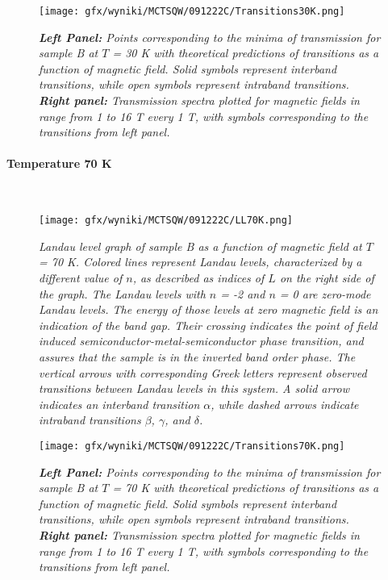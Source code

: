 \documentclass[titlepage,a4paper]{book}
\newcommand{\wciecie}{\quad\phantom{v}}
\newcommand{\myparagraph}[1]{\paragraph{#1}\mbox{}\\}
\begin{document}
\begin{figure}[ht]
	\centering
	\texttt{[image: gfx/wyniki/MCTSQW/091222C/Transitions30K.png]}
	\vspace{-10pt}
	\caption{\textit{\textbf{Left Panel:} Points corresponding to the minima of transmission for sample B at $T$ = 30 K with theoretical predictions of transitions as a function of magnetic field. Solid symbols represent interband transitions, while open symbols represent intraband transitions. \textbf{Right panel:} Transmission spectra plotted for magnetic fields in range from 1 to 16 T every 1 T, with symbols corresponding to the transitions from left panel.}}
	\label{fig:Summary_SQW_30K}
\end{figure}


\myparagraph{Temperature 70 K}
\wciecie
\begin{figure}[H]
	\centering
	\texttt{[image: gfx/wyniki/MCTSQW/091222C/LL70K.png]}
	\vspace{-10pt}
	\caption{\textit{Landau level graph of sample B as a function of magnetic field at $T$ = 70 K. Colored lines represent Landau levels, characterized by a different value of $n$, as described as indices of $L$ on the right side of the graph. The Landau levels with $n$ = -2 and $n$ = 0 are zero-mode Landau levels. The energy of those levels at zero magnetic field is an indication of the band gap. Their crossing indicates the point of field induced semiconductor-metal-semiconductor phase transition, and assures that the sample is in the inverted band order phase. The vertical arrows with corresponding Greek letters represent observed transitions between Landau levels in this system. A solid arrow indicates an interband transition $\alpha$, while dashed arrows indicate intraband transitions $\beta$, $\gamma$, and $\delta$.}}
	\label{fig:LL_SQW_70K}
\end{figure}

\begin{figure}[H]
	\centering
	\texttt{[image: gfx/wyniki/MCTSQW/091222C/Transitions70K.png]}
	\vspace{-10pt}
	\caption{\textit{\textbf{Left Panel:} Points corresponding to the minima of transmission for sample B at $T$ = 70 K with theoretical predictions of transitions as a function of magnetic field. Solid symbols represent interband transitions, while open symbols represent intraband transitions. \textbf{Right panel:} Transmission spectra plotted for magnetic fields in range from 1 to 16 T every 1 T, with symbols corresponding to the transitions from left panel.}}
	\label{fig:Summary_SQW_70K}
\end{figure}
\end{document}

